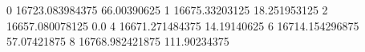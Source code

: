 0 16723.083984375 66.00390625
1 16675.33203125 18.251953125
2 16657.080078125 0.0
4 16671.271484375 14.19140625
6 16714.154296875 57.07421875
8 16768.982421875 111.90234375
